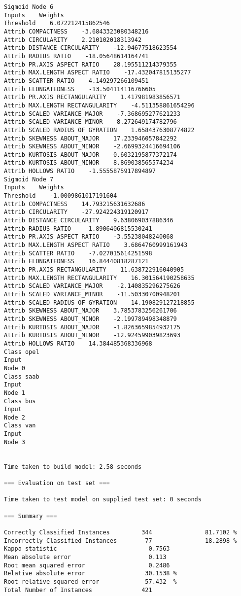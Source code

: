\documentclass[
	article,			%
	11pt,				%
	oneside,			%
	a4paper,			%
	english,			%
	brazil,				%
	sumario=tradicional
	]{abntex2}
\begin{document}
\begin{lstlisting}
Sigmoid Node 6
Inputs    Weights
Threshold    6.072212415862546
Attrib COMPACTNESS    -3.6843323080348216
Attrib CIRCULARITY    2.210102018313942
Attrib DISTANCE CIRCULARITY    -12.94677518623554
Attrib RADIUS RATIO    -18.05648614164741
Attrib PR.AXIS ASPECT RATIO    28.195511214379355
Attrib MAX.LENGTH ASPECT RATIO    -17.432047815135277
Attrib SCATTER RATIO    4.149297266109451
Attrib ELONGATEDNESS    -13.504114116766605
Attrib PR.AXIS RECTANGULARITY    1.417981983856571
Attrib MAX.LENGTH RECTANGULARITY    -4.511358861654296
Attrib SCALED VARIANCE_MAJOR    -7.368695277621233
Attrib SCALED VARIANCE_MINOR    8.272649174782796
Attrib SCALED RADIUS OF GYRATION    1.6584376308774822
Attrib SKEWNESS ABOUT_MAJOR    17.233946057842292
Attrib SKEWNESS ABOUT_MINOR    -2.6699324416694106
Attrib KURTOSIS ABOUT_MAJOR    0.6032195877372174
Attrib KURTOSIS ABOUT_MINOR    8.869038565574234
Attrib HOLLOWS RATIO    -1.5555875917894897
Sigmoid Node 7
Inputs    Weights
Threshold    -1.0009861017191604
Attrib COMPACTNESS    14.793215631632686
Attrib CIRCULARITY    -27.924224319120917
Attrib DISTANCE CIRCULARITY    9.638069037886346
Attrib RADIUS RATIO    -1.8906406815530241
Attrib PR.AXIS ASPECT RATIO    -3.55238048240068
Attrib MAX.LENGTH ASPECT RATIO    3.6864760999161943
Attrib SCATTER RATIO    -7.027015614251598
Attrib ELONGATEDNESS    16.84440818287121
Attrib PR.AXIS RECTANGULARITY    11.638722916040905
Attrib MAX.LENGTH RECTANGULARITY    16.301564190258635
Attrib SCALED VARIANCE_MAJOR    -2.140835296275626
Attrib SCALED VARIANCE_MINOR    -11.50330700948201
Attrib SCALED RADIUS OF GYRATION    14.190829127218855
Attrib SKEWNESS ABOUT_MAJOR    3.7853783256261706
Attrib SKEWNESS ABOUT_MINOR    -2.199789498348879
Attrib KURTOSIS ABOUT_MAJOR    -1.8263659854932175
Attrib KURTOSIS ABOUT_MINOR    -12.924599039823693
Attrib HOLLOWS RATIO    14.384485368336968
Class opel
Input
Node 0
Class saab
Input
Node 1
Class bus
Input
Node 2
Class van
Input
Node 3


Time taken to build model: 2.58 seconds

=== Evaluation on test set ===

Time taken to test model on supplied test set: 0 seconds

=== Summary ===

Correctly Classified Instances         344               81.7102 %
Incorrectly Classified Instances        77               18.2898 %
Kappa statistic                          0.7563
Mean absolute error                      0.113 
Root mean squared error                  0.2486
Relative absolute error                 30.1538 %
Root relative squared error             57.432  %
Total Number of Instances              421     


\end{lstlisting}
\end{document}
